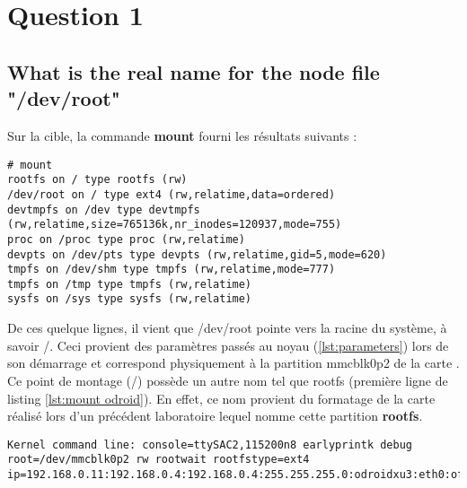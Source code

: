 
\chapter{Question 1} %

\label{Question 1} %


\section{What is the real name for the node file "/dev/root"}

Sur la cible, la commande \textbf{mount} fourni les résultats suivants :
\begin{lstlisting}[label=lst:mount odroid]
# mount
rootfs on / type rootfs (rw)
/dev/root on / type ext4 (rw,relatime,data=ordered)
devtmpfs on /dev type devtmpfs (rw,relatime,size=765136k,nr_inodes=120937,mode=755)
proc on /proc type proc (rw,relatime)
devpts on /dev/pts type devpts (rw,relatime,gid=5,mode=620)
tmpfs on /dev/shm type tmpfs (rw,relatime,mode=777)
tmpfs on /tmp type tmpfs (rw,relatime)
sysfs on /sys type sysfs (rw,relatime)
\end{lstlisting}
De ces quelque lignes, il vient que /dev/root pointe vers la racine du système, à savoir /. Ceci provient des paramètres passés au noyau (\ref{lst:parameters}) lors de son démarrage et correspond physiquement à la partition mmcblk0p2 de la carte \usd. Ce point de montage (/) possède un autre nom tel que rootfs (première ligne de listing \ref{lst:mount odroid}). En effet, ce nom provient du formatage de la carte \usd réalisé lors d'un précédent laboratoire lequel nomme cette partition \textbf{rootfs}.

\begin{lstlisting}[caption=Paramètres du noyau, label=lst:parameters]
Kernel command line: console=ttySAC2,115200n8 earlyprintk debug root=/dev/mmcblk0p2 rw rootwait rootfstype=ext4 ip=192.168.0.11:192.168.0.4:192.168.0.4:255.255.255.0:odroidxu3:eth0:off
\end{lstlisting}

